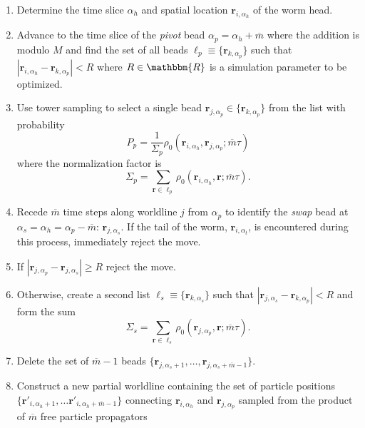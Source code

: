\documentclass[prb,aps,amssym,nofootinbib,floatfix,notitlepage]{revtex4-1}
\renewcommand{\vec}[1]{\boldsymbol{#1}}
\begin{document}
\begin{enumerate}
    \item Determine the time slice $\alpha_h$ and spatial location
        $\vec{r}_{i,\alpha_h}$ of the worm head.
    \item Advance to the time slice of the \emph{pivot} bead $\alpha_p =
        \alpha_h + \overline{m}$ where the addition is modulo $M$ and find the
        set of all beads $\ell_p \equiv \{\vec{r}_{k,\alpha_p}\}$ such that
        $|\vec{r}_{i,\alpha_h} - \vec{r}_{k,\alpha_p}| < R$ where $R \in
        \mathbbm{R}$ is a simulation parameter to be optimized.
\item Use tower sampling to select a single bead $\vec{r}_{j,\alpha_p} \in
    \{\vec{r}_{k,\alpha_p}\}$ from the list with probability
\begin{equation}
    P_p = \frac{1}{\Sigma_p}
    \rho_0(\vec{r}_{i,\alpha_h},\vec{r}_{j,\alpha_p};\overline{m}\tau)
\end{equation}
%
where the normalization factor is
%
\begin{equation}
\Sigma_p = \sum_{\vec{r}\in\ell_p} 
    \rho_0(\vec{r}_{i,\alpha_h},\vec{r};\overline{m}\tau).
\end{equation}
%
\item Recede $\overline{m}$ time steps along worldline $j$ from $\alpha_p$ to
    identify the \emph{swap} bead at $\alpha_s = \alpha_h =
    \alpha_p-\overline{m}$: $\vec{r}_{j,\alpha_s}$. If the tail of the worm,
    $\vec{r}_{i,\alpha_t}$, is encountered during this process, immediately reject the move.
\item If $|\vec{r}_{j,\alpha_p} - \vec{r}_{j,\alpha_s}| \ge R$ reject the move.
\item Otherwise, create a second list $\ell_s \equiv \{\vec{r}_{k,\alpha_s}\}$ such
    that $|\vec{r}_{j,\alpha_s} - \vec{r}_{k,\alpha_p}| < R$ and form the sum
\begin{equation}
\Sigma_s = \sum_{\vec{r}\in\ell_s} 
    \rho_0(\vec{r}_{j,\alpha_p},\vec{r};\overline{m}\tau).
\end{equation}
%
\item Delete the set of $\overline{m}-1$ beads
    $\{\vec{r}_{j,\alpha_s+1},\ldots,\vec{r}_{j,\alpha_s+\overline{m}-1} \}$.
\item Construct a new partial worldline containing the set of particle
    positions $\{\vec{r}'_{i,\alpha_h+1},\ldots
    \vec{r}'_{i,\alpha_h+\overline{m}-1}\}$
    connecting $\vec{r}_{i,\alpha_h}$ and $\vec{r}_{j,\alpha_p}$ sampled from
    the product of $\overline{m}$ free particle propagators

\end{enumerate}
\end{document}
